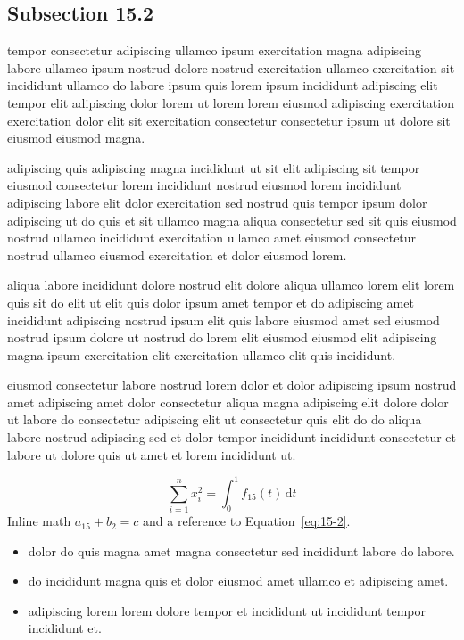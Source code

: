 \documentclass{article}
\begin{document}
\subsection{Subsection 15.2}\label{sec:15-2}
tempor consectetur adipiscing ullamco ipsum exercitation magna adipiscing labore ullamco ipsum nostrud dolore nostrud exercitation ullamco exercitation sit incididunt ullamco do labore ipsum quis lorem ipsum incididunt adipiscing elit tempor elit adipiscing dolor lorem ut lorem lorem eiusmod adipiscing exercitation exercitation dolor elit sit exercitation consectetur consectetur ipsum ut dolore sit eiusmod eiusmod magna.

adipiscing quis adipiscing magna incididunt ut sit elit adipiscing sit tempor eiusmod consectetur lorem incididunt nostrud eiusmod lorem incididunt adipiscing labore elit dolor exercitation sed nostrud quis tempor ipsum dolor adipiscing ut do quis et sit ullamco magna aliqua consectetur sed sit quis eiusmod nostrud ullamco incididunt exercitation ullamco amet eiusmod consectetur nostrud ullamco eiusmod exercitation et dolor eiusmod lorem.

aliqua labore incididunt dolore nostrud elit dolore aliqua ullamco lorem elit lorem quis sit do elit ut elit quis dolor ipsum amet tempor et do adipiscing amet incididunt adipiscing nostrud ipsum elit quis labore eiusmod amet sed eiusmod nostrud ipsum dolore ut nostrud do lorem elit eiusmod eiusmod elit adipiscing magna ipsum exercitation elit exercitation ullamco elit quis incididunt.

eiusmod consectetur labore nostrud lorem dolor et dolor adipiscing ipsum nostrud amet adipiscing amet dolor consectetur aliqua magna adipiscing elit dolore dolor ut labore do consectetur adipiscing elit ut consectetur quis elit do do aliqua labore nostrud adipiscing sed et dolor tempor incididunt incididunt consectetur et labore ut dolore quis ut amet et lorem incididunt ut.

\begin{equation}\label{eq:15-2}
  \sum_{i=1}^{n} x_i^{2} = \int_0^1 f_{15}(t)\,\mathrm{d}t
\end{equation}
Inline math $a_{15} + b_{2} = c$ and a reference to Equation~\eqref{eq:15-2}.

\begin{itemize}
  \item dolor do quis magna amet magna consectetur sed incididunt labore do labore.
  \item do incididunt magna quis et dolor eiusmod amet ullamco et adipiscing amet.
  \item adipiscing lorem lorem dolore tempor et incididunt ut incididunt tempor incididunt et.
\end{itemize}
\end{document}
